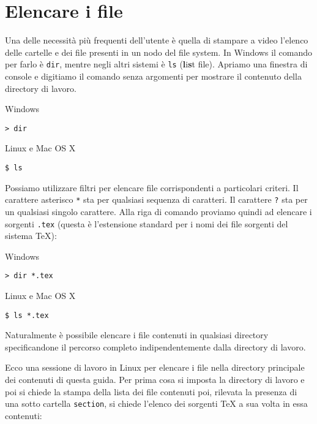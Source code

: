 \section{Elencare i file}

Una delle necessità più frequenti dell'utente è quella di stampare a video
l'elenco delle cartelle e dei file presenti in un nodo del file system. In
Windows il comando per farlo è \texttt{dir}, mentre negli altri sistemi è
\texttt{ls} (\textbf{l}i\textbf{s}t file). Apriamo una finestra di console e
digitiamo il comando senza argomenti per mostrare il contenuto della directory
di lavoro.

\noindent\begin{tcolorbox}[width=(\linewidth-6pt)/2,before=,after=\hfill]
Windows\tcblower
\begin{verbatim}
> dir
\end{verbatim}
\end{tcolorbox}
\begin{tcolorbox}[width=(\linewidth-6pt)/2,before=,after=\hfill]
Linux e Mac OS X\tcblower
\begin{verbatim}
$ ls
\end{verbatim}
\end{tcolorbox}

Possiamo utilizzare filtri per elencare file corrispondenti a particolari
criteri. Il carattere asterisco \texttt{*} sta per qualsiasi sequenza di
caratteri. Il carattere \texttt{?} sta per un qualsiasi singolo carattere. Alla
riga di comando proviamo quindi ad elencare i sorgenti \texttt{.tex} (questa è
l'estensione standard per i nomi dei file sorgenti del sistema \TeX):

\noindent\begin{tcolorbox}[width=(\linewidth-6pt)/2,before=,after=\hfill]
Windows\tcblower
\begin{verbatim}
> dir *.tex
\end{verbatim}
\end{tcolorbox}
\begin{tcolorbox}[width=(\linewidth-6pt)/2,before=,after=\hfill]
Linux e Mac OS X\tcblower
\begin{verbatim}
$ ls *.tex
\end{verbatim}
\end{tcolorbox}

Naturalmente è possibile elencare i file contenuti in qualsiasi directory
specificandone il percorso completo indipendentemente dalla directory di lavoro.

Ecco una sessione di lavoro in Linux per elencare i file nella directory
principale dei contenuti di questa guida. Per prima cosa si imposta la directory
di lavoro e poi si chiede la stampa della lista dei file contenuti poi, rilevata
la presenza di una sotto cartella \texttt{section}, si chiede l'elenco dei
sorgenti \TeX{} a sua volta in essa contenuti:


